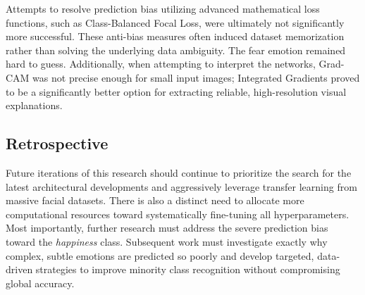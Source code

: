 Attempts to resolve prediction bias utilizing advanced mathematical loss functions, such as Class-Balanced Focal Loss, were ultimately not significantly more successful. These anti-bias measures often induced dataset memorization rather than solving the underlying data ambiguity. The fear emotion remained hard to guess. Additionally, when attempting to interpret the networks, Grad-CAM was not precise enough for small input images; Integrated Gradients proved to be a significantly better option for extracting reliable, high-resolution visual explanations.

\subsection{Retrospective}

Future iterations of this research should continue to prioritize the search for the latest architectural developments and aggressively leverage transfer learning from massive facial datasets. There is also a distinct need to allocate more computational resources toward systematically fine-tuning all hyperparameters. Most importantly, further research must address the severe prediction bias toward the \textit{happiness} class. Subsequent work must investigate exactly why complex, subtle emotions are predicted so poorly and develop targeted, data-driven strategies to improve minority class recognition without compromising global accuracy.

